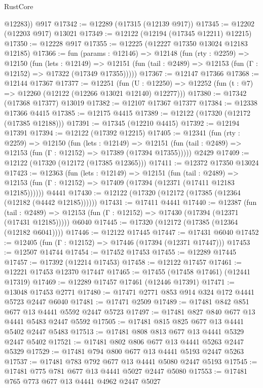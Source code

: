 \begin{lexlean}{RustCore}
\begin{coremodule}
        @12283))
    @917
@17342 := @12289 (@17315 (@12139 @917))
@17345 := @12202 (@12203 @917) @13021
@17349 := @12122 (@12194 (@17345 @12211) @12215)
@17350 := @12228 @917
@17355 := @12225 (@12227 @17350 @13024 @12183 @12185)
@17366 := fun (params : @12146) =>
  @12148
    (fun (rty : @2259) =>
    @12150
      (fun (lets : @12149) =>
      @12151 (fun (tail : @2489) => @12153 (fun (Γ : @12152) => @17322 (@17349 @17355)))))
@17367 := @12147 @17366
@17368 := @12144 @17367
@17377 := @12251
    (fun (U : @12250) => @12252 (fun (t : @7) => @12260 (@12122 (@12266 @13021 @12140) @12277)))
@17380 := @17342 (@17368 @17377) @13019
@17382 := @12107 @17367 @17377
@17384 := @12338 @17366 @4415
@17385 := @12175 @4415
@17389 := @12122 (@17320 (@12172 (@17385 @12188)))
@17391 := @17345 (@12210 @4415)
@17392 := @12194 @17391
@17394 := @12122 (@17392 @12215)
@17405 := @12341
    (fun (rty : @2259) =>
    @12150
      (fun (lets : @12149) =>
      @12151 (fun (tail : @2489) => @12153 (fun (Γ : @12152) => @17389 (@17394 @17355)))))
    @2429
@17409 := @12122 (@17320 (@12172 (@17385 @12365)))
@17411 := @12372 @17350 @13024
@17423 := @12363
    (fun (lets : @12149) =>
    @12151
      (fun (tail : @2489) =>
      @12153 (fun (Γ : @12152) => @17409 (@17394 (@12371 (@17411 @12183 @12185))))))
    @4441
@17430 := @12122 (@17320 (@12172 (@17385 (@12364 (@12182 (@4442 @12185))))))
@17431 := @17411 @4441
@17440 := @12387
    (fun (tail : @2489) => @12153 (fun (Γ : @12152) => @17430 (@17394 (@12371 (@17431 @12185)))))
    @6040
@17445 := @17320 (@12172 (@17385 (@12364 (@12182 @6041))))
@17446 := @12122 @17445
@17447 := @17431 @6040
@17452 := @12405 (fun (Γ : @12152) => @17446 (@17394 (@12371 @17447)))
@17453 := @12507 @14744
@17454 := @17452 @17453
@17455 := @12289 @17445
@17457 := @17392 (@12214 @17453)
@17458 := @12122 @17457
@17461 := @12221 @17453 @12370 @17447
@17465 := @17455 (@17458 @17461) (@12441 @17319)
@17469 := @12289 @17457 @17461 (@12446 @17391)
@17471 := @13048 @17453 @2771
@17480 := @17471 @2771 @853 @914 @324 @172 @4441 @5723 @2447 @6040
@17481 := @17471 @2509
@17489 := @17481 @842 @851 @677 @13 @4441 @5592 @2447 @5723
@17497 := @17481 @827 @840 @677 @13 @4441 @5483 @2447 @5592
@17505 := @17481 @815 @825 @677 @13 @4441 @5402 @2447 @5483
@17513 := @17481 @808 @813 @677 @13 @4441 @5329 @2447 @5402
@17521 := @17481 @802 @806 @677 @13 @4441 @5263 @2447 @5329
@17529 := @17481 @794 @800 @677 @13 @4441 @5193 @2447 @5263
@17537 := @17481 @783 @792 @677 @13 @4441 @5080 @2447 @5193
@17545 := @17481 @775 @781 @677 @13 @4441 @5027 @2447 @5080
@17553 := @17481 @765 @773 @677 @13 @4441 @4962 @2447 @5027

\end{coremodule}
\end{lexlean}
